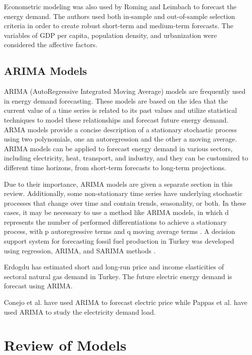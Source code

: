 \documentclass[lettersize,journal]{IEEEtran}
\begin{document}
  Econometric modeling was also used by Roming and Leimbach \cite{Roming} to forecast the energy demand. The authors used both in-sample and out-of-sample selection criteria in order to create robust short-term and medium-term forecasts. The variables of GDP per capita, population density, and urbanization were considered the affective factors.
  


  \subsection{ARIMA Models}
  ARIMA (AutoRegressive Integrated Moving Average) models are frequently used in energy demand forecasting. These models are based on the idea that the current value of a time series is related to its past values and utilize statistical techniques to model these relationships and forecast future energy demand. ARMA models provide a concise description of a stationary stochastic process using two polynomials, one an autoregression and the other a moving average. ARIMA models can be applied to forecast energy demand in various sectors, including electricity, heat, transport, and industry, and they can be customized to different time horizons, from short-term forecasts to long-term projections.

  Due to their importance, ARIMA models are given a separate section in this review. Additionally, some non-stationary time series have underlying stochastic processes that change over time and contain trends, seasonality, or both. In these cases, it may be necessary to use a method like ARIMA models, in which d represents the number of performed differentiations to achieve a stationary process, with p autoregressive terms and q moving average terms \cite{Box}. A decision support system for forecasting fossil fuel production in Turkey was developed using regression, ARIMA, and SARIMA methods \cite{Ediger 1, Ediger 2}.
 
  Erdogdu \cite{Erdogdu} has estimated short and long-run price and income elasticities of sectoral natural gas demand in Turkey. The future electric energy demand is forecast using ARIMA. 
  

  Conejo et al. \cite{Conejo} have used ARIMA to forecast electric price while Pappas et al. \cite{Pappas} have used ARIMA to study the electricity demand load.
 

\section{Review of Models}
\end{document}
